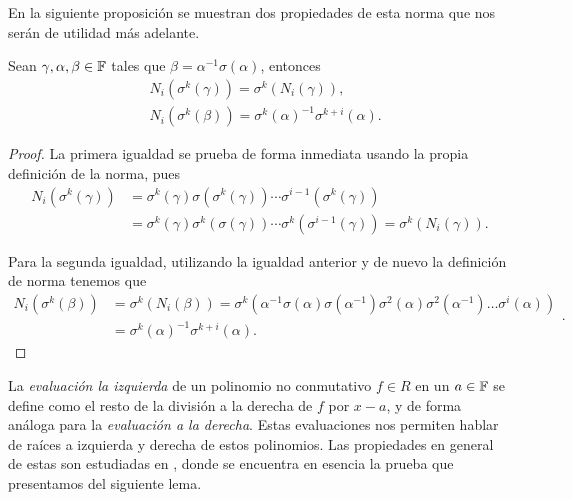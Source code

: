 En la siguiente proposición se muestran dos propiedades de esta norma que nos serán de utilidad más adelante.

\begin{proposition}
\label{prop:norm_properties}
Sean \(\gamma, \alpha, \beta \in \mathbb{F}\) tales que \(\beta = \alpha^{-1}\sigma(\alpha)\), entonces
\[
\begin{aligned}
&N_i(\sigma^{k}(\gamma)) = \sigma^{k}(N_i(\gamma)),\\
&N_i(\sigma^k(\beta)) = \sigma^{k}(\alpha)^{-1} \sigma^{k+i}(\alpha).
\end{aligned}\]
\end{proposition}

\begin{proof}
La primera igualdad se prueba de forma inmediata usando la propia definición de la norma, pues
\[
\begin{aligned}
N_i(\sigma^{k}(\gamma)) &= \sigma^{k}(\gamma) \sigma(\sigma^{k}(\gamma))\cdots \sigma^{i-1}(\sigma^{k}(\gamma)) \\
&= \sigma^{k}(\gamma) \sigma^{k}(\sigma(\gamma))\cdots \sigma^{k}(\sigma^{i-1}(\gamma)) = \sigma^{k}(N_i(\gamma)).
\end{aligned}
\]

Para la segunda igualdad, utilizando la igualdad anterior y de nuevo la definición de norma tenemos que
\[
\begin{aligned}
N_i(\sigma^{k}(\beta)) &= \sigma^{k}(N_i(\beta)) = \sigma^{k}\left(\alpha^{-1}\sigma(\alpha)\sigma(\alpha^{-1})\sigma^{2}(\alpha)\sigma^{2}(\alpha^{-1}) \ldots \sigma^{i}(\alpha) \right) \\
   &= \sigma^{k}(\alpha)^{-1} \sigma^{k+i}(\alpha).
\end{aligned}
.\]
\end{proof}

La \textit{evaluación la izquierda} de un polinomio no conmutativo \(f \in R\) en un \(a \in \mathbb{F}\) se define como el resto de la división a la derecha de \(f\) por  \(x - a\), y de forma análoga para la  \textit{evaluación a la derecha}. Estas evaluaciones nos permiten hablar de raíces a izquierda y derecha de estos polinomios. Las propiedades en general de estas son estudiadas en \cite{Lam_1988}, donde se encuentra en esencia la prueba que presentamos del siguiente lema.


